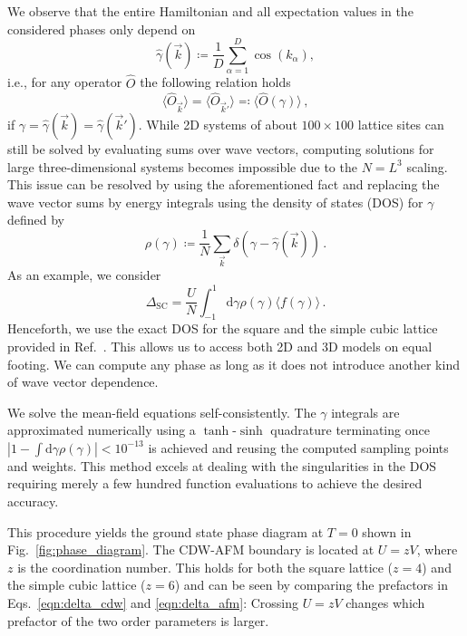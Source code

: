 \documentclass[
    reprint, 
    aps,
    preprintnumbers,
    twocolumn,
    prb,
    superscriptaddress
]{revtex4-2}
\newcommand{\vk}{\vec{k}}
\newcommand{\dgamma}{\mathrm{d}\gamma}
\begin{document}
We observe that  the entire Hamiltonian and all expectation values in the considered phases only depend on
\begin{equation}
    \widehat{\gamma}(\vk) \coloneqq \frac{1}{D} \sum_{\alpha=1}^D \cos(k_\alpha),
\end{equation}
i.e., for any operator $\widehat{O}$ the following relation holds 
\begin{equation}
    \label{eqn:equal_expecs}
    \langle \widehat{O}_{\vk} \rangle = \langle \widehat{O}_{\vk'} \rangle \eqqcolon \langle \widehat{O}( \gamma ) \rangle\,,
\end{equation}
if $\gamma= \widehat{\gamma}(\vk) = \widehat{\gamma}(\vk')$.
While 2D systems  of about $100\times100$ lattice sites can still be solved by evaluating sums over  wave vectors,
computing solutions for large three-dimensional systems becomes impossible due to the $N=L^3$ scaling.
This issue can be resolved by using the aforementioned fact and replacing the wave vector sums 
by energy integrals using the density of states (DOS) for $\gamma$ defined by
\begin{equation}
    \rho(\gamma) \coloneqq  \frac{1}{N} \sum_{\vk} \delta \left(\gamma - \widehat{\gamma} (\vk) \right)\,.
\end{equation}
As an example, we consider 
\begin{equation}
    \Delta_\text{SC} = \frac{U}{N} \int_{-1}^{1} \dgamma \rho(\gamma) \langle f( \gamma ) \rangle\,.
\end{equation}
Henceforth, we use the exact DOS for the square and the simple cubic lattice provided 
in Ref.\ \cite{Hanisch97}. 
This allows us to access both 2D and 3D models on equal footing.
We can compute any phase as long as it does not introduce another kind of wave vector dependence.


We solve the mean-field equations self-consistently.
The $\gamma$ integrals are approximated numerically using a $\tanh$-$\sinh$ quadrature \cite{takahasi73} 
terminating once $|1 - \int \dgamma \rho(\gamma)| < 10^{-13}$ is achieved
and reusing the computed sampling points and weights.
This method excels at dealing with the singularities in the DOS 
requiring merely a few hundred function evaluations to achieve the desired accuracy.

This procedure yields the ground state phase diagram at $T=0$ shown in Fig.\ 
\ref{fig:phase_diagram}.
The CDW-AFM boundary is located at $U = zV$, where $z$ is the coordination number.
This holds for both the square lattice ($z=4$) and the simple cubic lattice ($z=6$) and can be seen by comparing the prefactors in Eqs.\ \eqref{eqn:delta_cdw} and \eqref{eqn:delta_afm}:
Crossing $U = zV$ changes which prefactor of the two order parameters is larger.
\end{document}
